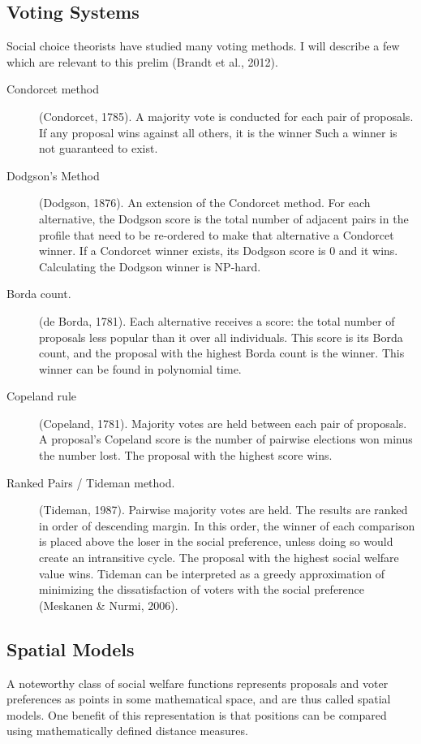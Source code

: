 \subsection{Voting Systems}
Social choice theorists have studied many voting methods. I will describe a few which are relevant to this prelim (Brandt et al., 2012).

\begin{description}
\item[Condorcet method]{(Condorcet, 1785).
A majority vote is conducted for each pair of proposals.
If any proposal wins against all others, it is the winner \.
Such a winner is not guaranteed to exist.}
\item[Dodgson's Method]{(Dodgson, 1876).
An extension of the Condorcet method.
For each alternative, the Dodgson score is the total number of adjacent pairs
in the profile that need to be re-ordered to make that alternative a Condorcet
winner.
If a Condorcet winner exists, its Dodgson score is 0 and it wins.
Calculating the Dodgson winner is NP-hard.}
\item[Borda count.]{(de Borda, 1781). Each alternative receives a score:
the total number of proposals less popular than it over all individuals.
This score is its Borda count, and the proposal with the highest Borda count is
the winner. This winner can be found in polynomial time.}
\item[Copeland rule]{(Copeland, 1781).
Majority votes are held between each pair of proposals.
A proposal's Copeland score is the number of pairwise elections won minus
the number lost. The proposal with the highest score wins.}
\item[Ranked Pairs / Tideman method.]{(Tideman, 1987).
Pairwise majority votes are held.
The results are ranked in order of descending margin. In this order,
the winner of each comparison is placed above the loser in the social
preference, unless doing so would create an intransitive cycle.
The proposal with the highest social welfare value wins.
Tideman can be interpreted as a greedy approximation of minimizing the
dissatisfaction of voters with the social preference (Meskanen \& Nurmi, 2006).}
\end{description}

\subsection{Spatial Models}
A noteworthy class of social welfare functions represents proposals and voter preferences as points in some mathematical space, and are thus called spatial models. One benefit of this representation is that positions can be compared using mathematically defined distance measures.

